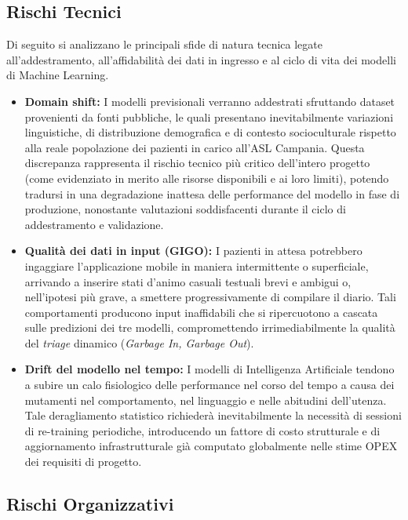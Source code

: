 \subsection*{Rischi Tecnici}

Di seguito si analizzano le principali sfide di natura tecnica legate all'addestramento, all'affidabilità dei dati in ingresso e al ciclo di vita dei modelli di Machine Learning.

\begin{itemize}
    \item \textbf{Domain shift:} I modelli previsionali verranno addestrati sfruttando dataset provenienti da fonti pubbliche, le quali presentano inevitabilmente variazioni linguistiche, di distribuzione demografica e di contesto socioculturale rispetto alla reale popolazione dei pazienti in carico all'ASL Campania. Questa discrepanza rappresenta il rischio tecnico più critico dell'intero progetto (come evidenziato in merito alle risorse disponibili e ai loro limiti), potendo tradursi in una degradazione inattesa delle performance del modello in fase di produzione, nonostante valutazioni soddisfacenti durante il ciclo di addestramento e validazione.
    \item \textbf{Qualità dei dati in input (GIGO):} I pazienti in attesa potrebbero ingaggiare l'applicazione mobile in maniera intermittente o superficiale, arrivando a inserire stati d'animo casuali testuali brevi e ambigui o, nell'ipotesi più grave, a smettere progressivamente di compilare il diario. Tali comportamenti producono input inaffidabili che si ripercuotono a cascata sulle predizioni dei tre modelli, compromettendo irrimediabilmente la qualità del \textit{triage} dinamico (\textit{Garbage In, Garbage Out}).
    \item \textbf{Drift del modello nel tempo:} I modelli di Intelligenza Artificiale tendono a subire un calo fisiologico delle performance nel corso del tempo a causa dei mutamenti nel comportamento, nel linguaggio e nelle abitudini dell'utenza. Tale deragliamento statistico richiederà inevitabilmente la necessità di sessioni di re-training periodiche, introducendo un fattore di costo strutturale e di aggiornamento infrastrutturale già computato globalmente nelle stime OPEX dei requisiti di progetto.
\end{itemize}

\subsection*{Rischi Organizzativi}

